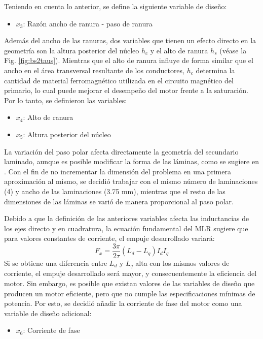 Teniendo en cuenta lo anterior, se define la siguiente variable de diseño:
\begin{itemize}
\item $x_3$: Razón ancho de ranura - paso de ranura
\end{itemize}

Además del ancho de las ranuras, dos variables que tienen un efecto directo en la geometría son la altura posterior del núcleo $h_c$ y el alto de ranura $h_s$ (véase la Fig. \ref{fig:bs2taus}). Mientras que el alto de ranura influye de forma similar que el ancho en el área transversal resultante de los conductores, $h_c$ determina la cantidad de material ferromagnético utilizada en el circuito magnético del primario, lo cual puede mejorar el desempeño del motor frente a la saturación. Por lo tanto, se definieron las variables:
\begin{itemize}
\item $x_4$: Alto de ranura
\item $x_5$: Altura posterior del núcleo
\end{itemize}

La variación del paso polar afecta directamente la geometría del secundario laminado, aunque es posible modificar la forma de las láminas, como se sugiere en \cite{hamler1998}. Con el fin de no incrementar la dimensión del problema en una primera aproximación al mismo, se decidió trabajar con el mismo número de laminaciones (4) y ancho de las laminaciones (3.75 mm), mientras que el resto de las dimensiones de las láminas se varió de manera proporcional al paso polar.

Debido a que la definición de las anteriores variables afecta las inductancias de los ejes directo y en cuadratura, la ecuación fundamental del MLR sugiere que para valores constantes de corriente, el empuje desarrollado variará:
\begin{equation*}
F_x = \frac{3\pi}{2\tau}(L_d - L_q)I_d I_q
\label{devthrust}
\end{equation*}
Si se obtiene una diferencia entre $L_d$ y $L_q$ alta con los mismos valores de corriente, el empuje desarrollado será mayor, y consecuentemente la eficiencia del motor. Sin embargo, es posible que existan valores de las variables de diseño que producen un motor eficiente, pero que no cumple las especificaciones mínimas de potencia. Por esto, se decidió añadir la corriente de fase del motor como una variable de diseño adicional:
\begin{itemize}
\item $x_6$: Corriente de fase
\end{itemize}

